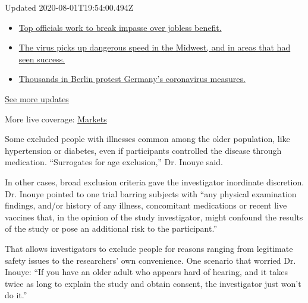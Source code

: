 Updated 2020-08-01T19:54:00.494Z

\begin{itemize}
\tightlist
\item
  \href{https://www.nytimes3xbfgragh.onion/2020/08/01/world/coronavirus-covid-19.html?action=click\&pgtype=Article\&state=default\&region=MAIN_CONTENT_1\&context=storylines_live_updates\#link-3ac56579}{Top
  officials work to break impasse over jobless benefit.}
\item
  \href{https://www.nytimes3xbfgragh.onion/2020/08/01/world/coronavirus-covid-19.html?action=click\&pgtype=Article\&state=default\&region=MAIN_CONTENT_1\&context=storylines_live_updates\#link-8796723}{The
  virus picks up dangerous speed in the Midwest, and in areas that had
  seen success.}
\item
  \href{https://www.nytimes3xbfgragh.onion/2020/08/01/world/coronavirus-covid-19.html?action=click\&pgtype=Article\&state=default\&region=MAIN_CONTENT_1\&context=storylines_live_updates\#link-25930521}{Thousands
  in Berlin protest Germany's coronavirus measures.}
\end{itemize}

\href{https://www.nytimes3xbfgragh.onion/2020/08/01/world/coronavirus-covid-19.html?action=click\&pgtype=Article\&state=default\&region=MAIN_CONTENT_1\&context=storylines_live_updates}{See
more updates}

More live coverage:
\href{https://www.nytimes3xbfgragh.onion/live/2020/07/31/business/stock-market-today-coronavirus?action=click\&pgtype=Article\&state=default\&region=MAIN_CONTENT_1\&context=storylines_live_updates}{Markets}

Some excluded people with illnesses common among the older population,
like hypertension or diabetes, even if participants controlled the
disease through medication. ``Surrogates for age exclusion,'' Dr. Inouye
said.

In other cases, broad exclusion criteria gave the investigator
inordinate discretion. Dr. Inouye pointed to one trial barring subjects
with ``any physical examination findings, and/or history of any illness,
concomitant medications or recent live vaccines that, in the opinion of
the study investigator, might confound the results of the study or pose
an additional risk to the participant.''

That allows investigators to exclude people for reasons ranging from
legitimate safety issues to the researchers' own convenience. One
scenario that worried Dr. Inouye: ``If you have an older adult who
appears hard of hearing, and it takes twice as long to explain the study
and obtain consent, the investigator just won't do it.''

